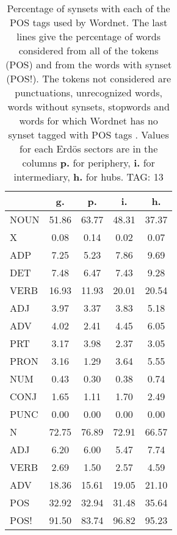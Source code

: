 \begin{table}[h!]
\begin{center}
\begin{tabular}{| l || c | c | c | c |}\hline
 & {\bf g.} & {\bf p.} & {\bf i.} & {\bf h.} \\\hline\hline
NOUN & 51.86  & 63.77  & 48.31  & 37.37 \\
X & 0.08  & 0.14  & 0.02  & 0.07 \\\hline
ADP & 7.25  & 5.23  & 7.86  & 9.69 \\
DET & 7.48  & 6.47  & 7.43  & 9.28 \\\hline
VERB & 16.93  & 11.93  & 20.01  & 20.54 \\\hline
ADJ & 3.97  & 3.37  & 3.83  & 5.18 \\
ADV & 4.02  & 2.41  & 4.45  & 6.05 \\\hline
PRT & 3.17  & 3.98  & 2.37  & 3.05 \\
PRON & 3.16  & 1.29  & 3.64  & 5.55 \\
NUM & 0.43  & 0.30  & 0.38  & 0.74 \\
CONJ & 1.65  & 1.11  & 1.70  & 2.49 \\
PUNC & 0.00  & 0.00  & 0.00  & 0.00 \\\hline\hline\hline
N & 72.75  & 76.89  & 72.91  & 66.57 \\\hline
ADJ & 6.20  & 6.00  & 5.47  & 7.74 \\\hline
VERB & 2.69  & 1.50  & 2.57  & 4.59 \\\hline
ADV & 18.36  & 15.61  & 19.05  & 21.10 \\\hline\hline
POS & 32.92  & 32.94  & 31.48  & 35.64 \\\hline
POS! & 91.50  & 83.74  & 96.82  & 95.23 \\\hline
\end{tabular}
\caption{Percentage of synsets with each of the POS tags used by Wordnet. The last lines give the percentage of words considered from all of the tokens (POS) and from the words with synset (POS!). The tokens not considered are punctuations, unrecognized words, words without synsets, stopwords and words for which Wordnet has no synset  tagged with POS tags . Values for each Erd\"os sectors are in the columns {{\bf p.}} for periphery, {{\bf i.}} for intermediary, {{\bf h.}} for hubs. TAG: 13}
\end{center}
\end{table}
